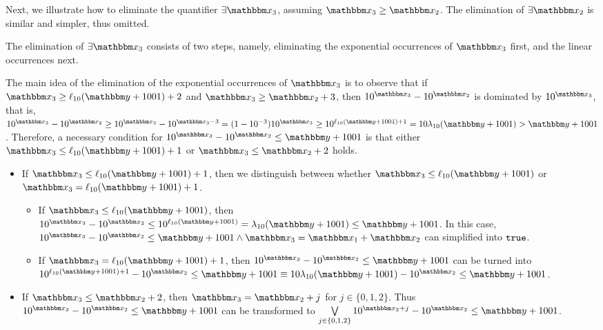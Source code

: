 Next, we illustrate how to eliminate the quantifier $\exists \ivarx_3$, assuming $\ivarx_3 \ge \ivarx_2$. The elimination of $\exists \ivarx_2$ is similar and simpler, thus omitted.

The elimination of $\exists \ivarx_3$ consists of two steps, namely, eliminating the exponential occurrences of $\ivarx_3$ first, and the linear occurrences next.

The main idea of the elimination of the exponential occurrences of $\ivarx_3$ is to observe that if $\ivarx_3 \ge \ell_{10}(\ivary+1001)+2$ and $\ivarx_3 \ge \ivarx_2 + 3$, then $10^{\ivarx_3} - 10^{\ivarx_2}$ is dominated by $10^{\ivarx_3}$, that is, $10^{\ivarx_3} - 10^{\ivarx_2} \ge 10^{\ivarx_3} - 10^{\ivarx_3 - 3} = (1-10^{-3}) 10^{\ivarx_3} \ge 10^{\ell_{10}(\ivary+1001)+1} = 10\lambda_{10}(\ivary+1001) > \ivary+1001$. Therefore, a necessary condition for $10^{\ivarx_3} - 10^{\ivarx_2} \le \ivary + 1001$ is that either $\ivarx_3 \le \ell_{10}(\ivary+1001)+1$ or $\ivarx_3 \le \ivarx_2 + 2$ holds.  
\begin{itemize}
\item If $\ivarx_3 \le \ell_{10}(\ivary+1001)+1$, then we distinguish between whether $\ivarx_3 \le \ell_{10}(\ivary+1001)$ or  $\ivarx_3 = \ell_{10}(\ivary+1001)+1$. 
\begin{itemize}
\item If $\ivarx_3 \le \ell_{10}(\ivary+1001)$, then $10^{\ivarx_3} - 10^{\ivarx_2} \le 10^{\ell_{10}(\ivary+1001)} = \lambda_{10}(\ivary+1001) \le \ivary + 1001$. In this case, $10^{\ivarx_3} - 10^{\ivarx_2} \le \ivary + 1001 \wedge \ivarx_3 = \ivarx_1 + \ivarx_2$ can simplified into $\mathtt{true}$.
%
\item If $\ivarx_3 = \ell_{10}(\ivary+1001)+1$, then $10^{\ivarx_3} - 10^{\ivarx_2} \le \ivary + 1001$ can be turned into $10^{\ell_{10}(\ivary+1001)+1} - 10^{\ivarx_2} \le \ivary + 1001 \equiv 10 \lambda_{10}(\ivary+1001) - 10^{\ivarx_2} \le \ivary + 1001 $.
\end{itemize} 
%
\item If $\ivarx_3 \le \ivarx_2 + 2$, then $\ivarx_3 = \ivarx_2 + j$ for $j \in \{0,1,2\}$. Thus $10^{\ivarx_3} - 10^{\ivarx_2} \le \ivary + 1001$ can be transformed to $\bigvee \limits_{j \in \{0,1,2\}} 10^{\ivarx_2 + j} - 10^{\ivarx_2} \le \ivary + 1001$.
\end{itemize}


